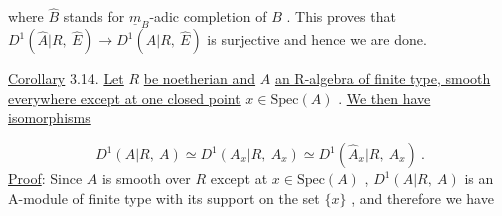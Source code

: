\begin{center}
\end{center}
where  $\hat{B}$  stands for  $\underline{m}_B$-adic completion of  $B$  . This proves that
$D^1(\hat{A}|R,\ \hat{E}) \to D^1(A|R,\ \hat{E})$  is surjective and hence we are done.



\underline{Corollary} 3.14. \underline{Let}  $R$  \underline{be noetherian and}  $A$  \underline{an R-algebra of finite type, smooth everywhere except at one closed point}  $x \in \mathrm{Spec}(A)$  . \underline{We then have isomorphisms}

\begin{equation*}
D^1(A|R,\ A) \simeq D^1(A_x|R,\ A_x) \simeq D^1(\hat{A}_x|R,\ \hat{A}_x)\ .
\end{equation*}
\underline{Proof}: Since  $A$  is smooth over  $R$  except at  $x \in \mathrm{Spec}(A)$  ,  $D^1(A|R,\ A)$  is an A-module of finite type with its support on the set  $\{x\}$  , and therefore we have

